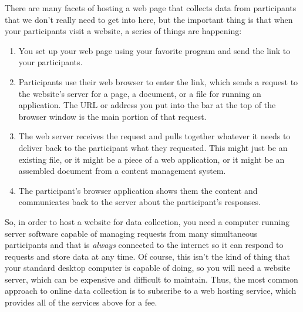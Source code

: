 There are many facets of hosting a web page that collects data from participants that we don't really need to get into here, but the important thing is that when your participants visit a website, a series of things are happening:
\begin{enumerate}
    \item You set up your web page using your favorite program and send the link to your participants.
    \item Participants use their web browser to enter the link, which sends a request to the website's server for a page, a document, or a file for running an application. The \gls{URL} or address you put into the bar at the top of the browser window is the main portion of that request.
    \item The web server receives the request and pulls together whatever it needs to deliver back to the participant what they requested. This might just be an existing file, or it might be a piece of a web application, or it might be an assembled document from a content management system.
    \item The participant's browser application shows them the content and communicates back to the server about the participant's responses.
\end{enumerate}
So, in order to host a website for data collection, you need a computer running server software capable of managing requests from many simultaneous participants and that is \emph{always} connected to the internet so it can respond to requests and store data at any time.  Of course, this isn't the kind of thing that your standard desktop computer is capable of doing, so you will need a website server, which can be expensive and difficult to maintain.  Thus, the most common approach to online data collection is to subscribe to a \gls{web hosting service}, which provides all of the services above for a fee.

